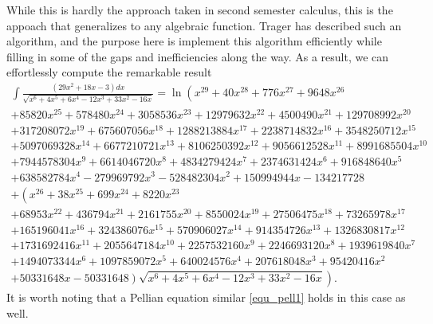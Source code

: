 \documentclass[12pt,reqno]{amsart}
\numberwithin{equation}{section}
\begin{document}
While this is hardly the approach taken in second semester calculus, this is the appoach that generalizes to any algebraic function. Trager \cite{trager} has described such an algorithm, and the purpose here is implement this algorithm efficiently while filling in some of the gaps and inefficiencies along the way. As a result, we can effortlessly compute the remarkable result
\begin{gather*}
\int \frac{(29 x^2+18 x-3)d x}{\sqrt{x^6+4 x^5+6 x^4-12 x^3+33 x^2-16 x}} = \ln \left(x^{29}+40 x^{28}+776 x^{27}+9648 x^{26}\right.\\
+85820 x^{25}+578480x^{24}+3058536 x^{23}+12979632 x^{22}+4500490x^{21}+129708992 x^{20}\\
+317208072 x^{19}+675607056x^{18}+1288213884 x^{17}+2238714832 x^{16}+3548250712x^{15}\\
+5097069328 x^{14}+6677210721 x^{13}+8106250392x^{12}+9056612528 x^{11}+8991685504 x^{10}\\
+7944578304x^9+6614046720 x^8+4834279424 x^7+2374631424x^6+916848640 x^5\\
+638582784 x^4-279969792 x^3-528482304x^2+150994944 x-134217728\\
+\left( x^{26}+38 x^{25}+699 x^{24}+8220 x^{23}\right.\\
+68953 x^{22}+436794x^{21}+2161755 x^{20}+8550024 x^{19}+27506475x^{18}+73265978 x^{17}\\
+165196041 x^{16}+324386076x^{15}+570906027 x^{14}+914354726 x^{13}+1326830817x^{12}\\
+1731692416 x^{11}+2055647184 x^{10}+2257532160x^9+2246693120 x^8+1939619840 x^7\\
+1494073344x^6+1097859072 x^5+640024576 x^4+207618048 x^3+95420416x^2\\
\left. \left. +50331648 x-50331648 \right) \sqrt{x^6+4 x^5+6 x^4-12 x^3+33 x^2-16 x} \right)\text{.}
\end{gather*}
It is worth noting that a Pellian equation similar \eqref{equ_pell1} holds in this case as well.
\end{document}
